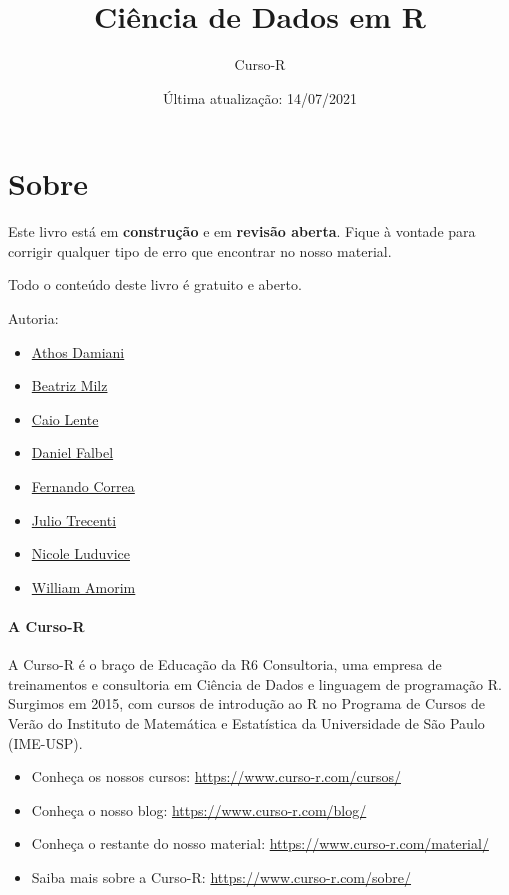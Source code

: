 \documentclass[
]{book}
\title{Ciência de Dados em R}
\author{Curso-R}
\date{Última atualização: 14/07/2021}
\providecommand{\tightlist}{%
  \setlength{\itemsep}{0pt}\setlength{\parskip}{0pt}}
\begin{document}
\maketitle

{
\setcounter{tocdepth}{1}
\tableofcontents
}
\hypertarget{sobre}{%
\chapter*{Sobre}\label{sobre}}

Este livro está em \textbf{construção} e em \textbf{revisão aberta}. Fique à vontade para corrigir qualquer tipo de erro que encontrar no nosso material.

Todo o conteúdo deste livro é gratuito e aberto.

Autoria:

\begin{itemize}
\tightlist
\item
  \href{https://twitter.com/athos_damiani}{Athos Damiani}
\item
  \href{https://twitter.com/BeaMilz}{Beatriz Milz}
\item
  \href{https://twitter.com/clente_}{Caio Lente}
\item
  \href{https://twitter.com/dfalbel}{Daniel Falbel}
\item
  \href{https://twitter.com/Azeloc}{Fernando Correa}
\item
  \href{https://twitter.com/jtrecenti}{Julio Trecenti}
\item
  \href{http://linkedin.com/in/nicole-luduvice-9a6379197}{Nicole Luduvice}
\item
  \href{https://wamorim.com}{William Amorim}
\end{itemize}

\hypertarget{a-curso-r}{%
\subsubsection*{A Curso-R}\label{a-curso-r}}

A Curso-R é o braço de Educação da R6 Consultoria, uma empresa de treinamentos e consultoria em Ciência de Dados e linguagem de programação R. Surgimos em 2015, com cursos de introdução ao R no Programa de Cursos de Verão do Instituto de Matemática e Estatística da Universidade de São Paulo (IME-USP).

\begin{itemize}
\item
  Conheça os nossos cursos: \url{https://www.curso-r.com/cursos/}
\item
  Conheça o nosso blog: \url{https://www.curso-r.com/blog/}
\item
  Conheça o restante do nosso material: \url{https://www.curso-r.com/material/}
\item
  Saiba mais sobre a Curso-R: \url{https://www.curso-r.com/sobre/}
\end{itemize}
\end{document}
